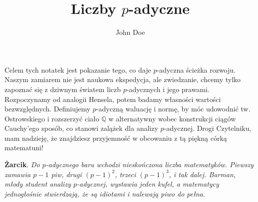 \documentclass[a4paper,fleqn,9pt]{extarticle}
\title{\textbf{Liczby $p$-adyczne}}
\author{John Doe}
\begin{document}
\maketitle

Celem tych notatek jest pokazanie tego, co daje $p$-adyczna ścieżka rozwoju. Naszym zamiarem nie jest naukowa ekspedycja, ale zwiedzanie, chcemy tylko zapoznać się z dziwnym światem liczb $p$-adycznych i jego prawami. Rozpoczynamy od analogii Hensela, potem badamy własności wartości bezwzględnych. Definiujemy $p$-adyczną waluację i normę, by móc udowodnić tw. Ostrowskiego i rozszerzyć ciało $\mathbb Q$ w alternatywny wobec konstrukcji ciągów Cauchy'ego sposób, co stanowi zalążek dla analizy $p$-adycznej. Drogi Czytelniku, mam nadzieję, że znajdziesz przyjemność w obcowaniu z tą piękną córką matematuni!


\textbf{Żarcik}. \emph{Do $p$-adycznego baru wchodzi nieskończona liczba matematyków. Piewszy zamawia $p-1$ piw, drugi $(p-1)^2$, trzeci $(p-1)^3$, i tak dalej. Barman, młody student analizy $p$-adycznej, wystawia jeden kufel, a matematycy jednogłośnie stwierdzają, że są idiotami i nalewają piwo do pełna.}

\end{document}
